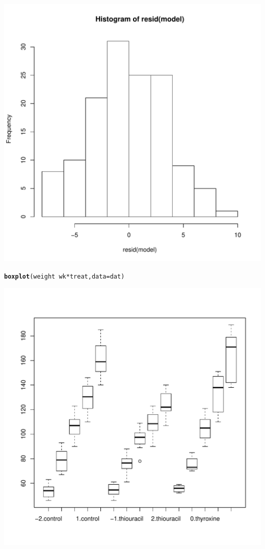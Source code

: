 \documentclass{article}\usepackage[]{graphicx}\usepackage[]{color}
\makeatletter
\def\maxwidth{ %
  \ifdim\Gin@nat@width>\linewidth
    \linewidth
  \else
    \Gin@nat@width
  \fi
}
\newcommand{\hlopt}[1]{\textcolor[rgb]{0,0,0}{#1}}%
\newcommand{\hlstd}[1]{\textcolor[rgb]{0.345,0.345,0.345}{#1}}%
\newcommand{\hlkwc}[1]{\textcolor[rgb]{0.333,0.667,0.333}{#1}}%
\newcommand{\hlkwd}[1]{\textcolor[rgb]{0.737,0.353,0.396}{\textbf{#1}}}%
\newenvironment{kframe}{%
 \def\at@end@of@kframe{}%
 \ifinner\ifhmode%
  \def\at@end@of@kframe{\end{minipage}}%
  \begin{minipage}{\columnwidth}%
 \fi\fi%
 \def\FrameCommand##1{\hskip\@totalleftmargin \hskip-\fboxsep
 \colorbox{shadecolor}{##1}\hskip-\fboxsep
     \hskip-\linewidth \hskip-\@totalleftmargin \hskip\columnwidth}%
 \MakeFramed {\advance\hsize-\width
   \@totalleftmargin\z@ \linewidth\hsize
   \@setminipage}}%
 {\par\unskip\endMakeFramed%
 \at@end@of@kframe}
\newenvironment{knitrout}{}{} %
\makeatother
\begin{document}
\begin{enumerate}[(a)]
\begin{knitrout}
\includegraphics[width=\maxwidth]{figure/unnamed-chunk-12-2} 
\begin{kframe}\begin{alltt}
  \hlkwd{boxplot}\hlstd{(weight} \hlopt{~} \hlstd{wk}\hlopt{*}\hlstd{treat,} \hlkwc{data} \hlstd{= dat)}
\end{alltt}
\end{kframe}
\includegraphics[width=\maxwidth]{figure/unnamed-chunk-12-3} 


\end{knitrout}
\end{enumerate}
\end{document}
